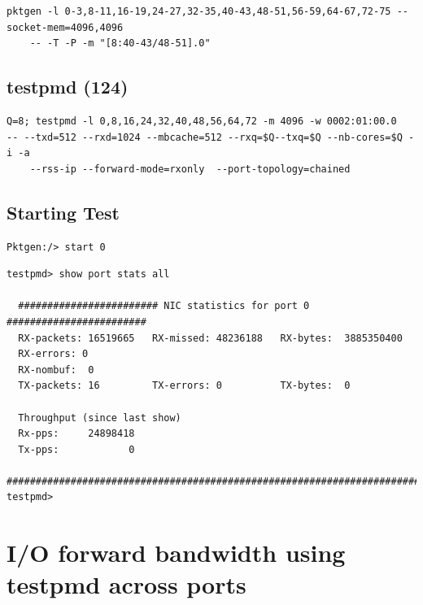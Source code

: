 \documentclass[letter]{article}
\begin{document}
{%
\begin{lstlisting}
pktgen -l 0-3,8-11,16-19,24-27,32-35,40-43,48-51,56-59,64-67,72-75 --socket-mem=4096,4096 
	-- -T -P -m "[8:40-43/48-51].0"
\end{lstlisting}

\subsection{testpmd (124)}

\begin{lstlisting}[escapechar=!]
Q=8; testpmd -l 0,8,16,24,32,40,48,56,64,72 -m 4096 -w 0002:01:00.0 
-- --txd=512 --rxd=1024 --mbcache=512 --rxq=$Q--txq=$Q --nb-cores=$Q -i -a 
	--rss-ip --forward-mode=rxonly  --port-topology=chained
\end{lstlisting}

\subsection{Starting Test}

\begin{lstlisting}[escapechar=!]
Pktgen:/> start 0
\end{lstlisting}

\begin{lstlisting}
testpmd> show port stats all

  ######################## NIC statistics for port 0  ########################
  RX-packets: 16519665   RX-missed: 48236188   RX-bytes:  3885350400
  RX-errors: 0
  RX-nombuf:  0         
  TX-packets: 16         TX-errors: 0          TX-bytes:  0

  Throughput (since last show)
  Rx-pps:     24898418
  Tx-pps:            0
  ############################################################################
testpmd> 
\end{lstlisting}

\section{I/O forward bandwidth using testpmd across ports}
{\setlength{\parindent}{0cm}

}}
\end{document}
